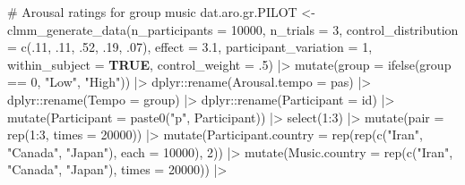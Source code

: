 \documentclass[
  bookmarksnumbered]{article}
\newenvironment{Shaded}{\begin{snugshade}}{\end{snugshade}}
\newcommand{\AttributeTok}[1]{\textcolor[rgb]{0.80,0.80,0.80}{#1}}
\newcommand{\CommentTok}[1]{\textcolor[rgb]{0.50,0.62,0.50}{#1}}
\newcommand{\ConstantTok}[1]{\textcolor[rgb]{0.86,0.64,0.64}{\textbf{#1}}}
\newcommand{\DecValTok}[1]{\textcolor[rgb]{0.86,0.86,0.80}{#1}}
\newcommand{\FloatTok}[1]{\textcolor[rgb]{0.75,0.75,0.82}{#1}}
\newcommand{\FunctionTok}[1]{\textcolor[rgb]{0.94,0.94,0.56}{#1}}
\newcommand{\NormalTok}[1]{\textcolor[rgb]{0.80,0.80,0.80}{#1}}
\newcommand{\OtherTok}[1]{\textcolor[rgb]{0.94,0.94,0.56}{#1}}
\newcommand{\SpecialCharTok}[1]{\textcolor[rgb]{0.86,0.64,0.64}{#1}}
\newcommand{\StringTok}[1]{\textcolor[rgb]{0.80,0.58,0.58}{#1}}
\begin{document}
\begin{Shaded}
\begin{Highlighting}[]
\CommentTok{\# Arousal ratings for group music}
\NormalTok{dat.aro.gr.PILOT }\OtherTok{\textless{}{-}} \FunctionTok{clmm\_generate\_data}\NormalTok{(}\AttributeTok{n\_participants =} \DecValTok{10000}\NormalTok{,}
                                 \AttributeTok{n\_trials =} \DecValTok{3}\NormalTok{,}
                                 \AttributeTok{control\_distribution =} \FunctionTok{c}\NormalTok{(.}\DecValTok{11}\NormalTok{, .}\DecValTok{11}\NormalTok{, .}\DecValTok{52}\NormalTok{, .}\DecValTok{19}\NormalTok{, .}\DecValTok{07}\NormalTok{),}
                                 \AttributeTok{effect =} \FloatTok{3.1}\NormalTok{,}
                                 \AttributeTok{participant\_variation =} \DecValTok{1}\NormalTok{,}
                                 \AttributeTok{within\_subject =} \ConstantTok{TRUE}\NormalTok{,}
                                 \AttributeTok{control\_weight =}\NormalTok{ .}\DecValTok{5}\NormalTok{) }\SpecialCharTok{|\textgreater{}}
  \FunctionTok{mutate}\NormalTok{(}\AttributeTok{group =} \FunctionTok{ifelse}\NormalTok{(group }\SpecialCharTok{==} \DecValTok{0}\NormalTok{, }\StringTok{"Low"}\NormalTok{, }\StringTok{"High"}\NormalTok{)) }\SpecialCharTok{|\textgreater{}}
\NormalTok{  dplyr}\SpecialCharTok{::}\FunctionTok{rename}\NormalTok{(}\AttributeTok{Arousal.tempo =}\NormalTok{ pas) }\SpecialCharTok{|\textgreater{}}
\NormalTok{  dplyr}\SpecialCharTok{::}\FunctionTok{rename}\NormalTok{(}\AttributeTok{Tempo =}\NormalTok{ group) }\SpecialCharTok{|\textgreater{}}
\NormalTok{  dplyr}\SpecialCharTok{::}\FunctionTok{rename}\NormalTok{(}\AttributeTok{Participant =}\NormalTok{ id) }\SpecialCharTok{|\textgreater{}}
  \FunctionTok{mutate}\NormalTok{(}\AttributeTok{Participant =} \FunctionTok{paste0}\NormalTok{(}\StringTok{"p"}\NormalTok{, Participant)) }\SpecialCharTok{|\textgreater{}}
  \FunctionTok{select}\NormalTok{(}\DecValTok{1}\SpecialCharTok{:}\DecValTok{3}\NormalTok{) }\SpecialCharTok{|\textgreater{}}
  \FunctionTok{mutate}\NormalTok{(}\AttributeTok{pair =} \FunctionTok{rep}\NormalTok{(}\DecValTok{1}\SpecialCharTok{:}\DecValTok{3}\NormalTok{, }\AttributeTok{times =} \DecValTok{20000}\NormalTok{)) }\SpecialCharTok{|\textgreater{}}
  \FunctionTok{mutate}\NormalTok{(}\AttributeTok{Participant.country =} \FunctionTok{rep}\NormalTok{(}\FunctionTok{rep}\NormalTok{(}\FunctionTok{c}\NormalTok{(}\StringTok{"Iran"}\NormalTok{, }\StringTok{"Canada"}\NormalTok{, }\StringTok{"Japan"}\NormalTok{), }\AttributeTok{each =} \DecValTok{10000}\NormalTok{), }\DecValTok{2}\NormalTok{)) }\SpecialCharTok{|\textgreater{}}
  \FunctionTok{mutate}\NormalTok{(}\AttributeTok{Music.country =} \FunctionTok{rep}\NormalTok{(}\FunctionTok{c}\NormalTok{(}\StringTok{"Iran"}\NormalTok{, }\StringTok{"Canada"}\NormalTok{, }\StringTok{"Japan"}\NormalTok{), }\AttributeTok{times =} \DecValTok{20000}\NormalTok{)) }\SpecialCharTok{|\textgreater{}}

\end{Highlighting}
\end{Shaded}
\end{document}
